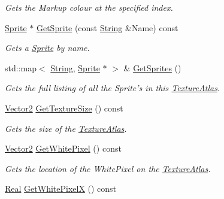 \begin{DoxyCompactItemize}
\begin{DoxyCompactList}\small\item\em Gets the Markup colour at the specified index. \item\end{DoxyCompactList}\item 
\hyperlink{structMezzanine_1_1UI_1_1Sprite}{Sprite} $\ast$ \hyperlink{classMezzanine_1_1UI_1_1TextureAtlas_a88827bd4a7e2129897af2b29c168f880}{GetSprite} (const \hyperlink{namespaceMezzanine_acf9fcc130e6ebf08e3d8491aebcf1c86}{String} \&Name) const 
\begin{DoxyCompactList}\small\item\em Gets a \hyperlink{structMezzanine_1_1UI_1_1Sprite}{Sprite} by name. \item\end{DoxyCompactList}\item 
std::map$<$ \hyperlink{namespaceMezzanine_acf9fcc130e6ebf08e3d8491aebcf1c86}{String}, \hyperlink{structMezzanine_1_1UI_1_1Sprite}{Sprite} $\ast$ $>$ \& \hyperlink{classMezzanine_1_1UI_1_1TextureAtlas_aa5350ef5930a7003b21e81e0b3acd9fc}{GetSprites} ()
\begin{DoxyCompactList}\small\item\em Gets the full listing of all the Sprite's in this \hyperlink{classMezzanine_1_1UI_1_1TextureAtlas}{TextureAtlas}. \item\end{DoxyCompactList}\item 
\hyperlink{classMezzanine_1_1Vector2}{Vector2} \hyperlink{classMezzanine_1_1UI_1_1TextureAtlas_a22ff62e8b77f3046d99f71d75c74c884}{GetTextureSize} () const 
\begin{DoxyCompactList}\small\item\em Gets the size of the \hyperlink{classMezzanine_1_1UI_1_1TextureAtlas}{TextureAtlas}. \item\end{DoxyCompactList}\item 
\hyperlink{classMezzanine_1_1Vector2}{Vector2} \hyperlink{classMezzanine_1_1UI_1_1TextureAtlas_a7acd11a76ae146d663651f2dbd4c9db0}{GetWhitePixel} () const 
\begin{DoxyCompactList}\small\item\em Gets the location of the WhitePixel on the \hyperlink{classMezzanine_1_1UI_1_1TextureAtlas}{TextureAtlas}. \item\end{DoxyCompactList}\item 
\hyperlink{namespaceMezzanine_a726731b1a7df72bf3583e4a97282c6f6}{Real} \hyperlink{classMezzanine_1_1UI_1_1TextureAtlas_a5ba574d66b110f10066b3e77a7527814}{GetWhitePixelX} () const 

\end{DoxyCompactItemize}
